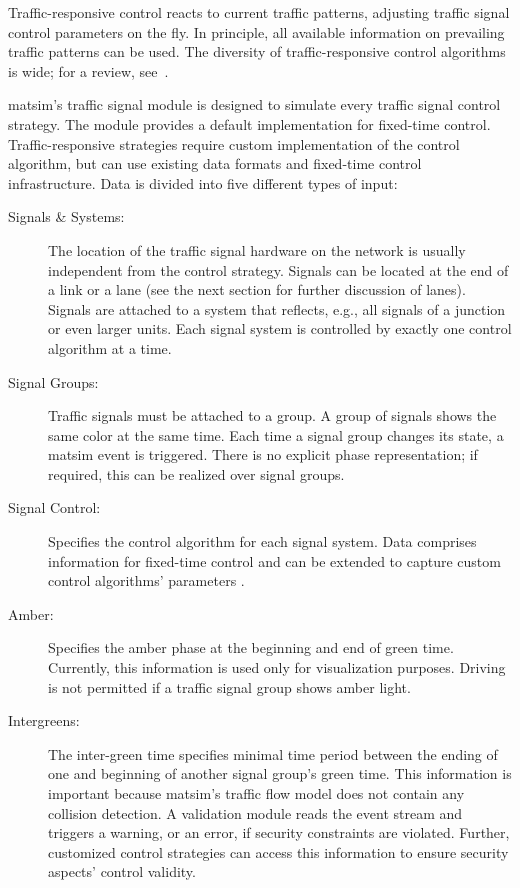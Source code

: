 Traffic-responsive control reacts to current traffic patterns, adjusting traffic signal control parameters on the fly. 
In principle, all available information on prevailing traffic patterns can be used. 
The diversity of traffic-responsive control algorithms is wide; for a review, see~\citet[][]{Grether2014PhD}. 

\gls{matsim}'s traffic signal module is designed to simulate every traffic signal control strategy. 
The module provides a default implementation for fixed-time control. 
Traffic-responsive strategies require custom implementation of the control algorithm, but can use existing data formats and fixed-time control infrastructure. 
Data is divided into five different types of input:
%
\begin{description}
	\item[Signals \& Systems:] The location of the traffic signal hardware on the network is usually independent from the control strategy. 
		Signals can be located at the end of a link or a lane (see the next section for further discussion of lanes). Signals are attached to a system that reflects, e.g., all signals of a junction or even larger units. 
		Each signal system is controlled by exactly one control algorithm at a time.  
	\item[Signal Groups:] Traffic signals must be attached to a group. 
		A group of signals shows the same color at the same time. 
		Each time a signal group changes its state, a \gls{matsim} event is triggered. 
		There is no explicit phase representation; 
		if required, this can be realized over signal groups.  
	\item[Signal Control:] Specifies the control algorithm for each signal system. 
		Data comprises information for fixed-time control and can be extended to capture custom control algorithms' parameters . 
	\item[Amber:] Specifies the amber phase at the beginning and end of green time. 
		Currently, this information is used only for visualization purposes. 
		Driving is not permitted if a traffic signal group shows amber light. 
	\item[Intergreens:] The inter-green time specifies minimal time period between the ending of one and beginning of another signal group's green time.  
		This information is important because \gls{matsim}'s traffic flow model does not contain any collision detection. 
		A validation module reads the event stream and triggers a warning, or an error, if security constraints are violated. 
		Further, customized control strategies can access this information to ensure security aspects' control validity.    
\end{description}


